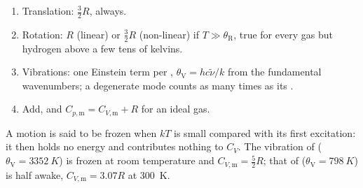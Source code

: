 \begin{method}\label{met:b3:statistical-thermo-applied:cv}
\begin{enumerate}
  \item Translation: $\frac32R$, always.
  \item Rotation: $R$ (linear) or $\frac32R$ (non-linear) if $T \gg \theta_{\mathrm R}$, true for every
        gas but hydrogen above a few tens of kelvins.
  \item Vibrations: one Einstein term per , $\theta_{\mathrm V} = hc\tilde\nu/k$ from
        the fundamental wavenumbers; a degenerate mode counts as many times as
        its .
  \item Add, and $C_{p,\mathrm m} = C_{V,\mathrm m} + R$ for an ideal gas.
\end{enumerate}
\end{method}

A motion is said to be frozen when $kT$ is small compared with its first
excitation: it then holds no energy and contributes nothing to $C_V$. The
vibration of  ($\theta_{\mathrm V} = \qty{3352}{K}$) is frozen at room temperature and
$C_{V,\mathrm m} = \frac52R$; that of  ($\theta_{\mathrm V} = \qty{798}{K}$) is half awake,
$C_{V,\mathrm m} = 3.07R$ at \qty{300}{K}.

